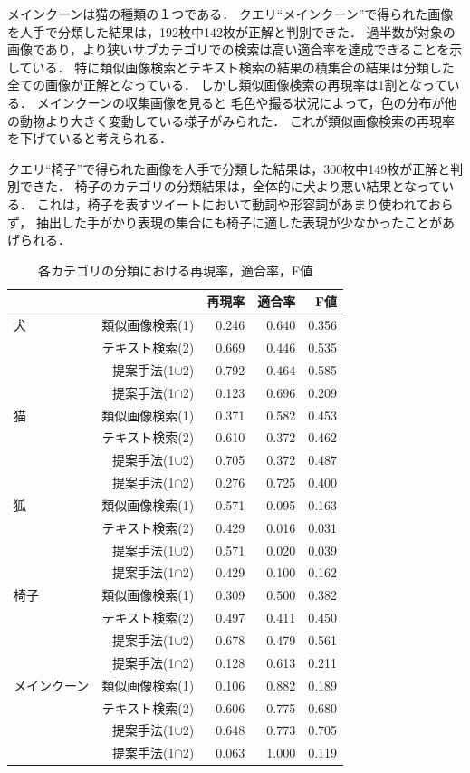 \documentclass{deimj}
\begin{document}
メインクーンは猫の種類の１つである．
クエリ“メインクーン”で得られた画像を人手で分類した結果は，192枚中142枚が正解と判別できた．
過半数が対象の画像であり，より狭いサブカテゴリでの検索は高い適合率を達成できることを示している．
特に類似画像検索とテキスト検索の結果の積集合の結果は分類した全ての画像が正解となっている．
しかし類似画像検索の再現率は1割となっている．
メインクーンの収集画像を見ると
毛色や撮る状況によって，色の分布が他の動物より大きく変動している様子がみられた．
これが類似画像検索の再現率を下げていると考えられる．


クエリ“椅子”で得られた画像を人手で分類した結果は，300枚中149枚が正解と判別できた．
椅子のカテゴリの分類結果は，全体的に犬より悪い結果となっている．
これは，椅子を表すツイートにおいて動詞や形容詞があまり使われておらず，
抽出した手がかり表現の集合にも椅子に適した表現が少なかったことがあげられる．

\begin{table}%
\begin{center}
\caption{各カテゴリの分類における再現率，適合率，F値}
\label{tab:result-ex}
\begin{tabular}{|l|r|r|r|r|}\hline
&& 再現率& 適合率& F値\\ \hline \hline
犬
& 類似画像検索(1)& 0.246& 0.640& 0.356 \\ \cline{2-5}
& テキスト検索(2)& 0.669& 0.446& 0.535 \\ \cline{2-5}
& 提案手法(1$\cup$2)& 0.792& 0.464& 0.585 \\ \cline{2-5}
& 提案手法(1$\cap$2)& 0.123& 0.696& 0.209 \\ \hline
猫
& 類似画像検索(1)& 0.371& 0.582& 0.453 \\ \cline{2-5}
& テキスト検索(2)& 0.610& 0.372& 0.462 \\ \cline{2-5}
& 提案手法(1$\cup$2)& 0.705& 0.372& 0.487 \\ \cline{2-5}
& 提案手法(1$\cap$2)& 0.276& 0.725& 0.400 \\ \hline
狐
& 類似画像検索(1)& 0.571& 0.095& 0.163 \\ \cline{2-5}
& テキスト検索(2)& 0.429& 0.016& 0.031 \\ \cline{2-5}
& 提案手法(1$\cup$2)& 0.571& 0.020& 0.039 \\ \cline{2-5}
& 提案手法(1$\cap$2)& 0.429& 0.100& 0.162 \\ \hline
椅子
& 類似画像検索(1)& 0.309& 0.500& 0.382 \\ \cline{2-5}
& テキスト検索(2)& 0.497& 0.411& 0.450 \\ \cline{2-5}
& 提案手法(1$\cup$2)& 0.678& 0.479& 0.561 \\ \cline{2-5}
& 提案手法(1$\cap$2)& 0.128& 0.613& 0.211 \\ \hline
メインクーン
& 類似画像検索(1)& 0.106& 0.882& 0.189 \\ \cline{2-5}
& テキスト検索(2)& 0.606& 0.775& 0.680 \\ \cline{2-5}
& 提案手法(1$\cup$2)& 0.648& 0.773& 0.705 \\ \cline{2-5}
& 提案手法(1$\cap$2)& 0.063& 1.000& 0.119 \\ \hline
\end{tabular}
\end{center}
\end{table}
\end{document}
